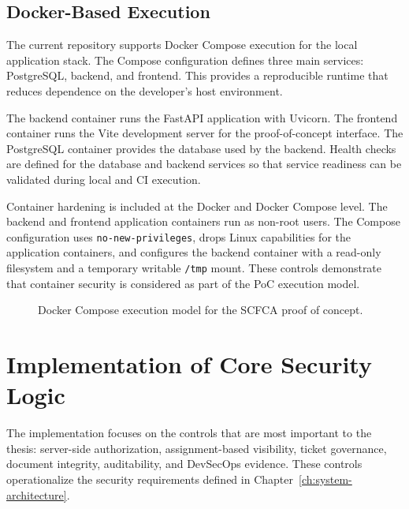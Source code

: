 \documentclass[12pt,a4paper]{report}
\begin{document}
\subsection{Docker-Based Execution}

The current repository supports Docker Compose execution for the local application stack. The Compose configuration defines three main services: PostgreSQL, backend, and frontend. This provides a reproducible runtime that reduces dependence on the developer's host environment.

The backend container runs the FastAPI application with Uvicorn. The frontend container runs the Vite development server for the proof-of-concept interface. The PostgreSQL container provides the database used by the backend. Health checks are defined for the database and backend services so that service readiness can be validated during local and CI execution.

Container hardening is included at the Docker and Docker Compose level. The backend and frontend application containers run as non-root users. The Compose configuration uses \texttt{no-new-privileges}, drops Linux capabilities for the application containers, and configures the backend container with a read-only filesystem and a temporary writable \texttt{/tmp} mount. These controls demonstrate that container security is considered as part of the PoC execution model.

\begin{figure}[htbp]
    \centering
    \caption{Docker Compose execution model for the SCFCA proof of concept.}
    \label{fig:scfca-docker-compose-model}
\end{figure}

\section{Implementation of Core Security Logic}

The implementation focuses on the controls that are most important to the thesis: server-side authorization, assignment-based visibility, ticket governance, document integrity, auditability, and DevSecOps evidence. These controls operationalize the security requirements defined in Chapter~\ref{ch:system-architecture}.
\end{document}
